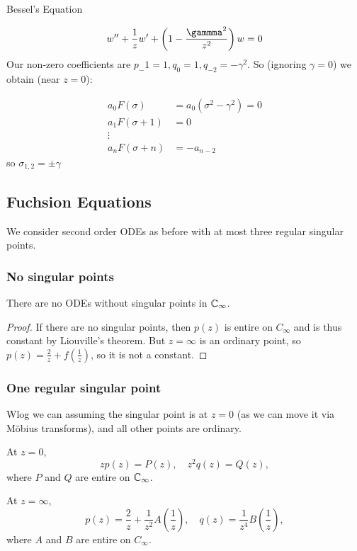 \documentclass[a4paper]{article}
\begin{document}
\begin{eg} Bessel's Equation

	\[
		w'' + \frac{1}{z} w' + \left(1-\frac{\gammma^2}{z^2}\right)w =0
\]
Our non-zero coefficients are $p_-1 = 1, q_0 = 1, q_{-2} = -\gamma^2$. So (ignoring $\gamma = 0$) we obtain (near $z=0$):

\begin{align*}
	a_0F(\sigma) &= a_0(\sigma^2 - \gamma^2) = 0 \\
	a_1 F(\sigma + 1) &= 0 \\
	\vdots \\
	a_nF(\sigma + n) &= -a_{n-2}
\end{align*}
so $\sigma_{1,2} = \pm \gamma$
\end{eg}

\subsection{Fuchsion Equations}

We consider second order ODEs as before with at most three regular singular points.

\subsubsection{No singular points}

\begin{prop}
	There are no ODEs without singular points in $\mathbb{C}_{\infty}$.
\end{prop}

\begin{proof}
	If there are no singular points, then  $p(z)$ is entire on $C_{\infty}$ and is thus constant by Liouville's theorem. But $z = \infty$ is an ordinary point, so $p(z) = \frac{2}{z} + f\left( \frac{1}{z} \right) $, so it is not a constant.
\end{proof}

\subsubsection{One regular singular point}

Wlog we can assuming the singular point is at $z=0$ (as we can move it via M\"{o}bius transforms), and all other points are ordinary.

At  $z=0$, 
\[
	zp(z) = P(z), \quad z^2q(z) = Q(z)
,\] where $P$ and $Q$ are entire on $\mathbb{C}_{\infty}$.

At $z=\infty$,
\[
	p(z) = \frac{2}{z}+\frac{1}{z^2}A\left( \frac{1}{z} \right), \quad q(z) = \frac{1}{z^{4}}B\left( \frac{1}{z} \right)  
,\] where $A$ and $B$ are entire on $C_{\infty}$.
\end{document}

